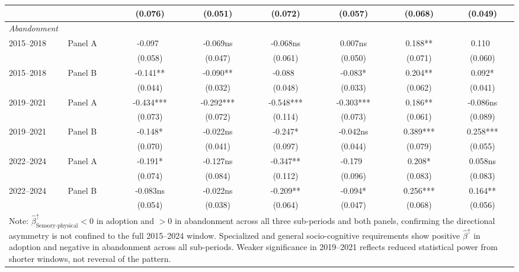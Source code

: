 \begin{table}[ht]
\begin{tabular}{llcccccc}
 & & (0.076) & (0.051) & (0.072) & (0.057) & (0.068) & (0.049) \\
\midrule
\multicolumn{8}{l}{\textit{Abandonment}} \\
\multirow{2}{*}{2015–2018} & Panel A & -0.097~ & -0.069ns & -0.068ns & 0.007ns & 0.188** & 0.110~ \\
 & & (0.058) & (0.047) & (0.061) & (0.050) & (0.071) & (0.060) \\
\multirow{2}{*}{2015–2018} & Panel B & -0.141** & -0.090** & -0.088~ & -0.083* & 0.204** & 0.092* \\
 & & (0.044) & (0.032) & (0.048) & (0.033) & (0.062) & (0.041) \\
\multirow{2}{*}{2019–2021} & Panel A & -0.434*** & -0.292*** & -0.548*** & -0.303*** & 0.186** & -0.086ns \\
 & & (0.073) & (0.072) & (0.114) & (0.073) & (0.061) & (0.089) \\
\multirow{2}{*}{2019–2021} & Panel B & -0.148* & -0.022ns & -0.247* & -0.042ns & 0.389*** & 0.258*** \\
 & & (0.070) & (0.041) & (0.097) & (0.044) & (0.079) & (0.055) \\
\multirow{2}{*}{2022–2024} & Panel A & -0.191* & -0.127ns & -0.347** & -0.179~ & 0.208* & 0.058ns \\
 & & (0.074) & (0.084) & (0.112) & (0.096) & (0.083) & (0.083) \\
\multirow{2}{*}{2022–2024} & Panel B & -0.083ns & -0.022ns & -0.209** & -0.094* & 0.256*** & 0.164** \\
 & & (0.054) & (0.038) & (0.064) & (0.047) & (0.068) & (0.056) \\
\bottomrule
\multicolumn{8}{p{15cm}}{\footnotesize Note:
  $\hat{\beta}^{\uparrow}_{\text{Sensory-physical}} < 0$ in adoption and $> 0$
  in abandonment across all three sub-periods and both panels, confirming
  the directional asymmetry is not confined to the full 2015--2024 window.
  Specialized and general socio-cognitive requirements show positive
  $\hat{\beta}^{\uparrow}$ in adoption and negative in abandonment across
  all sub-periods. Weaker significance in 2019--2021 reflects reduced
  statistical power from shorter windows, not reversal of the pattern.}
\end{tabular}
\end{table}
